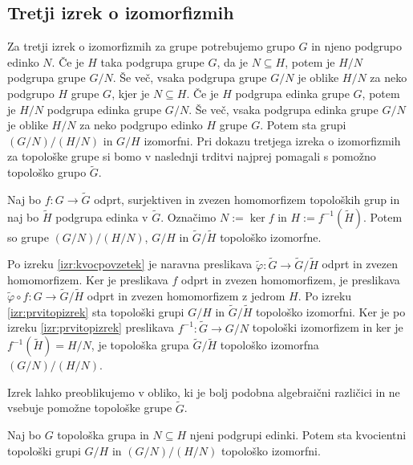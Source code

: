 \documentclass[mat1]{fmfdelo}
\begin{document}
\subsection{Tretji izrek o izomorfizmih}
Za tretji izrek o izomorfizmih za grupe potrebujemo grupo $G$ in njeno podgrupo edinko $N$. Če je $H$ taka podgrupa grupe $G$, da je $N \subseteq H$, potem je $H/N$ podgrupa grupe $G/N$. Še več, vsaka podgrupa grupe $G/N$ je oblike $H/N$ za neko podgrupo $H$ grupe $G$, kjer je $N \subseteq H$. Če je $H$ podgrupa edinka grupe $G$, potem je $H/N$ podgrupa edinka grupe $G/N$. Še več, vsaka podgrupa edinka grupe $G/N$ je oblike $H/N$ za neko podgrupo edinko $H$ grupe $G$. Potem sta grupi $(G/N)/(H/N)$ in $G/H$ izomorfni. Pri dokazu tretjega izreka o izomorfizmih za topološke grupe si bomo v naslednji trditvi najprej pomagali s pomožno topološko grupo $\widetilde{G}$.
\begin{trditev}\label{trd:predtretji}
	Naj bo $f\colon G \to \widetilde{G}$ odprt, surjektiven in zvezen homomorfizem topoloških grup in naj bo $\widetilde{H}$ podgrupa edinka v $\widetilde{G}$. Označimo $N := \ker f$ in $H := f^{-1}(\widetilde{H})$. Potem so grupe $(G/N)/(H/N)$, $G/H$ in $\widetilde{G}/\widetilde{H}$ topološko izomorfne.
\end{trditev}

\begin{dokaz}
Po izreku \ref{izr:kvocpovzetek} je naravna preslikava $\tilde{\varphi}\colon \widetilde{G} \to \widetilde{G}/\widetilde{H}$ odprt in zvezen homomorfizem. Ker je preslikava $f$ odprt in zvezen homomorfizem, je preslikava $\tilde{\varphi}\circ f\colon G \to \widetilde{G}/\widetilde{H}$ odprt in zvezen homomorfizem z jedrom $H$. Po izreku \ref{izr:prvitopizrek} sta topološki grupi $G/H$ in $\widetilde{G}/\widetilde{H}$ topološko izomorfni. Ker je po izreku \ref{izr:prvitopizrek} preslikava $f^{-1}\colon \widetilde{G} \to G/N$ topološki izomorfizem in ker je $f^{-1}(\widetilde{H}) = H/N$, je topološka grupa $\widetilde{G}/\widetilde{H}$ topološko izomorfna $(G/N)/(H/N)$.
\end{dokaz}
Izrek lahko preoblikujemo v obliko, ki je bolj podobna algebraični različici in ne vsebuje pomožne topološke grupe $\widetilde{G}$.
\begin{izrek}\label{izr:tretjitopizrek}
Naj bo $G$ topološka grupa in $N \subseteq H$ njeni podgrupi edinki. Potem sta kvocientni topološki grupi $G/H$ in $(G/N)/(H/N)$ topološko izomorfni.
\end{izrek}
\end{document}
